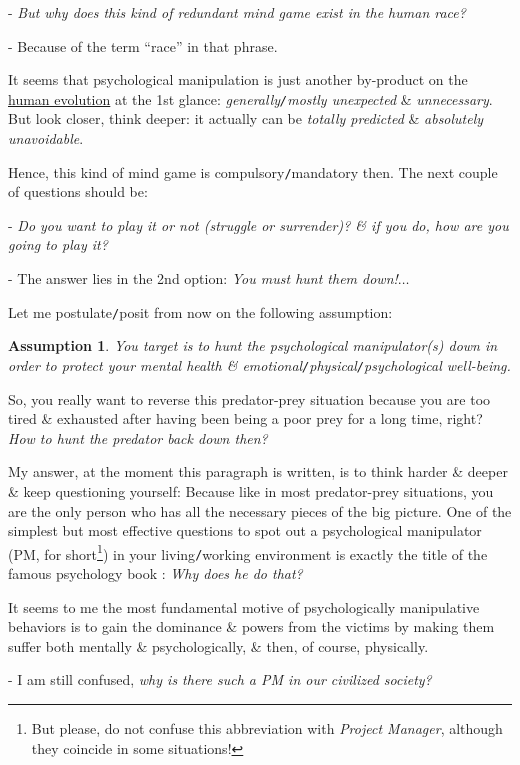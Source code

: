 \documentclass[12pt,oneside]{book}
\newtheorem{assumption}{Assumption}
\begin{document}
- {\it But why does this kind of redundant mind game exist in the human race?}

- Because of the term ``race'' in that phrase.

It seems that psychological manipulation is just another by-product on the \href{https://en.wikipedia.org/wiki/Human_evolution}{human evolution} at the 1st glance: {\it generally{\tt/}mostly unexpected} \& {\it unnecessary}. But look closer, think deeper: it actually can be {\it totally predicted} \& {\it absolutely unavoidable}.

Hence, this kind of mind game is compulsory{\tt/}mandatory then. The next couple of questions should be:

- {\it Do you want to play it or not (struggle or surrender)? \& if you do, how are you going to play it?}

- The answer lies in the 2nd option: {\it You must hunt them down!$\ldots$}

Let me postulate{\tt/}posit from now on the following assumption:

\begin{assumption}
	You target is to hunt the psychological manipulator(s) down in order to protect your mental health \& emotional{\tt/}physical{\tt/}psychological well-being.
\end{assumption}
So, you really want to reverse this predator-prey situation because you are too tired \& exhausted after having been being a poor prey for a long time, right? {\it How to hunt the predator back down then?}

My answer, at the moment this paragraph is written, is to think harder \& deeper \& keep questioning yourself: Because like in most predator-prey situations, you are the only person who has all the necessary pieces of the big picture. One of the simplest but most effective questions to spot out a psychological manipulator (PM, for short\footnote{But please, do not confuse this abbreviation with {\it Project Manager}, although they coincide in some situations!}) in your living{\tt/}working environment is exactly the title of the famous psychology book \cite{Bancroft_why_he_do,Bancroft_why_he_do_VN}: {\it Why does he do that?}

It seems to me the most fundamental motive of psychologically manipulative behaviors is to gain the dominance \& powers from the victims by making them suffer both mentally \& psychologically, \& then, of course, physically. 

- I am still confused, {\it why is there such a PM in our civilized society?}
\end{document}
